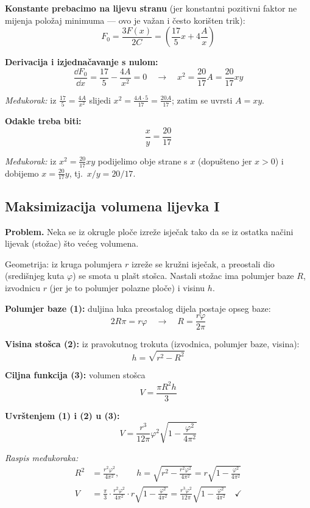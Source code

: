 \textbf{Konstante prebacimo na lijevu stranu} (jer konstantni pozitivni faktor
ne mijenja položaj minimuma --- ovo je važan i često korišten trik):
\[
F_0 = \frac{3F(x)}{2C} = \left(\frac{17}{5}x + 4\frac{A}{x}\right)
\]

\textbf{Derivacija i izjednačavanje s nulom:}
\[
\frac{\dd F_0}{\dd x} = \frac{17}{5} - \frac{4A}{x^2} = 0
\quad \to \quad x^2 = \frac{20}{17}A = \frac{20}{17}xy
\]

\emph{Međukorak:} iz $\tfrac{17}{5} = \tfrac{4A}{x^2}$ slijedi
$x^2 = \tfrac{4A \cdot 5}{17} = \tfrac{20A}{17}$; zatim se uvrsti $A = xy$.

\textbf{Odakle treba biti:}
\[
\frac{x}{y} = \frac{20}{17}
\]

\emph{Međukorak:} iz $x^2 = \tfrac{20}{17}xy$ podijelimo obje strane s $x$
(dopušteno jer $x > 0$) i dobijemo $x = \tfrac{20}{17}y$, tj.\ $x/y = 20/17$.

\subsection{Maksimizacija volumena lijevka I}

\textbf{Problem.} Neka se iz okrugle ploče izreže isječak tako da se iz ostatka
načini lijevak (stožac) što većeg volumena.

Geometrija: iz kruga polumjera $r$ izreže se kružni isječak, a preostali dio
(središnjeg kuta $\varphi$) se smota u plašt stošca. Nastali stožac ima polumjer
baze $R$, izvodnicu $r$ (jer je to polumjer polazne ploče) i visinu $h$.

\textbf{Polumjer baze (1):} duljina luka preostalog dijela postaje opseg baze:
\begin{equation}
2R\pi = r\varphi \quad \to \quad R = \frac{r\varphi}{2\pi}
\end{equation}

\textbf{Visina stošca (2):} iz pravokutnog trokuta (izvodnica, polumjer baze,
visina):
\begin{equation}
h = \sqrt{r^2 - R^2}
\end{equation}

\textbf{Ciljna funkcija (3):} volumen stošca
\begin{equation}
V = \frac{\pi R^2 h}{3}
\end{equation}

\textbf{Uvrštenjem (1) i (2) u (3):}
\[
V = \frac{r^3}{12\pi}\varphi^2 \sqrt{1 - \frac{\varphi^2}{4\pi^2}}
\]

\emph{Raspis međukoraka:}
\begin{align}
R^2 &= \frac{r^2\varphi^2}{4\pi^2}, \qquad
h = \sqrt{r^2 - \frac{r^2\varphi^2}{4\pi^2}}
  = r\sqrt{1 - \frac{\varphi^2}{4\pi^2}} \\
V &= \frac{\pi}{3}\cdot\frac{r^2\varphi^2}{4\pi^2}\cdot
     r\sqrt{1 - \frac{\varphi^2}{4\pi^2}}
   = \frac{r^3\varphi^2}{12\pi}\sqrt{1 - \frac{\varphi^2}{4\pi^2}}
   \quad \checkmark
\end{align}

